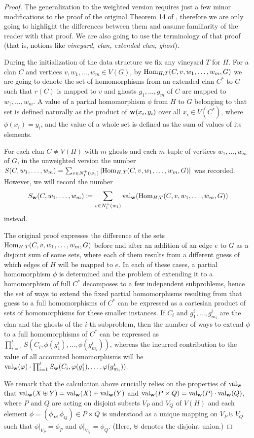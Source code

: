 \begin{proof}
	The generalization to the weighted version requires just a few minor modifications to the proof of the original Theorem 14 of \cite{DvorakTumaArxiv}, therefore we are only going to highlight the differences between them and assume familiarity of the reader with that proof. We are also going to use the terminology of that proof (that is, notions like \textit{vineyard, clan, extended clan, ghost}).
	
	During the initialization of the data structure we fix any vineyard $T$ for $H$. For a clan $C$ and vertices $v, w_1, \ldots, w_m \in V(G)$, by $\mathrm{Hom}_{H, T}(C, v, w_1, \ldots, w_m, G)$ we are going to denote the set of homomorphisms from an extended clan $C^*$ to $G$ such that $r(C)$ is mapped to $v$ and ghosts $g_1, \ldots, g_m$ of $C$ are mapped to $w_1, \ldots, w_m$. A value of a partial homomorphism $\phi$ from $H$ to $G$ belonging to that set is defined naturally as the product of $\mathbf{w}(x_i, y_i)$ over all $x_i \in V(C^*)$, where $\phi(x_i) = y_i$, and the value of a whole set is defined as the sum of values of its elements.
	
	For each clan $C \neq V(H)$ with $m$ ghosts and each $m$-tuple of vertices $w_1, \ldots, w_m$ of $G$, in the unweighted version the number $S(C, w_1, \ldots, w_m) = \sum_{v \in N_1^+(w_1)} |\mathrm{Hom}_{H, T}(C, v, w_1, \ldots, w_m, G)|$ was recorded. However, we will record the number \[S_{\mathbf{w}}(C, w_1, \ldots, w_m) \coloneqq \sum_{v \in N_1^+(w_1)} \mathrm{val}_{\mathbf{w}}(\mathrm{Hom}_{H, T}(C, v, w_1, \ldots, w_m, G))\] instead. 
			
	The original proof expresses the difference of the sets $\mathrm{Hom}_{H, T}(C, v, w_1, \ldots, w_m, G)$ before and after an addition of an edge $e$ to $G$ as a disjoint sum of some sets, where each of them results from a different guess of which edges of $H$ will be mapped to $e$. In each of these cases, a partial homomorphism $\phi$ is determined and the problem of extending it to a homomorphism of full $C^*$ decomposes to a few independent subproblems, hence the set of ways to extend the fixed partial homomorphisms resulting from that guess to a full homomorphisms of $C^*$ can be expressed as a cartesian product of sets of homomorphisms for these smaller instances. If $C_i$ and $g_1^i, \ldots, g_{m_i}^i$ are the clan and the ghosts of the $i$-th subproblem, then the number of ways to extend $\phi$ to a full homomorphisms of $C^*$ can be expressed as $\prod_{i=1}^{t} S(C_i, \phi(g_1^i), \ldots, \phi(g_{m_i}^i))$, whereas the incurred contribution to the value of all accounted homomorphisms will be $\mathrm{val}_{\mathbf{w}}(\varphi) \cdot \prod_{i=1}^{t}S_{\mathbf{w}}(C_i, \varphi(g_1^i), \ldots, \varphi(g_{m_i}^i))$.
	
	We remark that the calculation above crucially relies on the properties of $\mathrm{val}_{\mathbf{w}}$ that $\mathrm{val}_{\mathbf{w}}(X \uplus Y) = \mathrm{val}_{\mathbf{w}}(X) + \mathrm{val}_{\mathbf{w}}(Y)$ and $\mathrm{val}_{\mathbf{w}}(P \times Q) = \mathrm{val}_{\mathbf{w}}(P) \cdot \mathrm{val}_{\mathbf{w}}(Q)$, where $P$ and $Q$ are acting on disjoint subsets $V_P$ and $V_Q$ of $V(H)$ and each element $\phi = (\phi_P, \phi_Q) \in P \times Q$ is understood as a unique mapping on $V_P \uplus V_Q$ such that $\phi|_{V_P} = \phi_P$ and $\phi|_{V_Q} = \phi_Q$. (Here, $\uplus$ denotes the disjoint union.) 
\end{proof}

